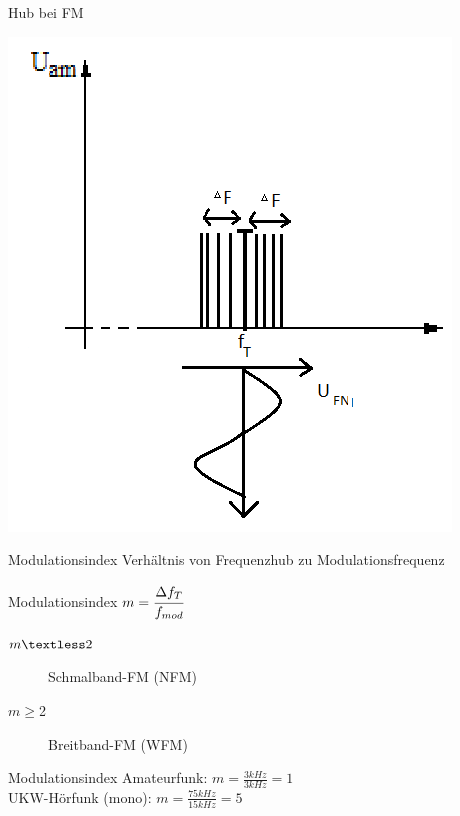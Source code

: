 \begin{frame}{Hub bei FM}
  \begin{center}
    \includegraphics[width=\textwidth,height=.85\textheight,keepaspectratio]{e14/Hub.png}
  \end{center}
\end{frame}

\begin{frame}{Modulationsindex}
  Verhältnis von Frequenzhub zu Modulationsfrequenz
  \begin{block}{Modulationsindex}
    $m = \cfrac{\Delta f_T}{f_{mod}}$
  \end{block}
  \begin{description}
    \item[$m\textless2$] Schmalband-FM (NFM)
    \item[$m\geq$2] Breitband-FM (WFM)
  \end{description}
  \begin{exampleblock}{Modulationsindex}
    Amateurfunk: $m = \frac{3kHz}{3kHz} = 1$\\
    UKW-Hörfunk (mono): $m = \frac{75kHz}{15kHz} = 5$\\
  \end{exampleblock}
\end{frame}

